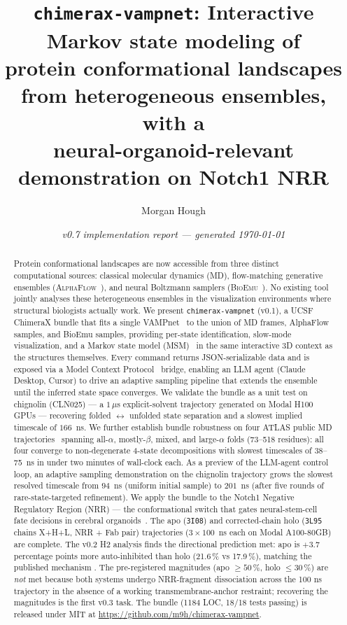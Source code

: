 \documentclass[11pt]{article}
\title{\textbf{\texttt{chimerax-vampnet}: Interactive Markov state modeling of\\
protein conformational landscapes from heterogeneous ensembles, with a\\
neural-organoid-relevant demonstration on Notch1 NRR}}
\author[1]{Morgan Hough}
\affil[1]{MedARC}
\date{\textit{v0.7 implementation report --- generated \today}}
\begin{document}
\maketitle

\begin{abstract}
\noindent
Protein conformational landscapes are now accessible from three distinct
computational sources: classical molecular dynamics (MD), flow-matching
generative ensembles (\textsc{AlphaFlow}~\cite{jing2024alphaflow}), and
neural Boltzmann samplers
(\textsc{BioEmu}~\cite{lewis2026bioemu}). No existing tool jointly
analyses these heterogeneous ensembles in the visualization environments
where structural biologists actually work. We present
\texttt{chimerax-vampnet} (v0.1), a UCSF ChimeraX bundle that fits a
single VAMPnet~\cite{mardt2018vampnets} to the union of MD frames,
AlphaFlow samples, and BioEmu samples, providing per-state
identification, slow-mode visualization, and a Markov state model
(MSM)~\cite{husic2018msm} in the same interactive 3D context as the
structures themselves. Every command returns JSON-serializable data and
is exposed via a Model Context Protocol~\cite{anthropic2024mcp} bridge,
enabling an LLM agent (Claude Desktop, Cursor) to drive an adaptive
sampling pipeline that extends the ensemble until the inferred state
space converges. We validate the bundle as a unit test on chignolin
(CLN025) --- a $1\,\mu$s explicit-solvent trajectory generated on Modal
H100 GPUs --- recovering folded $\leftrightarrow$ unfolded state
separation and a slowest implied timescale of $166$~ns. We further
establish bundle robustness on four ATLAS public MD
trajectories~\cite{vandermeersche2024atlas} spanning all-$\alpha$,
mostly-$\beta$, mixed, and large-$\alpha$ folds (73--518 residues): all
four converge to non-degenerate 4-state decompositions with slowest
timescales of 38--75~ns in under two minutes of wall-clock each. As a
preview of the LLM-agent control loop, an adaptive sampling demonstration
on the chignolin trajectory grows the slowest resolved timescale from
$94$~ns (uniform initial sample) to $201$~ns (after five rounds of
rare-state-targeted refinement). We apply the bundle to the Notch1
Negative Regulatory Region (NRR) --- the conformational switch that
gates neural-stem-cell fate decisions in cerebral
organoids~\cite{lancaster2013organoids,imayoshi2014bhlh}. The apo
(\texttt{3I08}) and corrected-chain holo (\texttt{3L95} chains
X+H+L, NRR + Fab pair) trajectories
($3 \times 100$~ns each on Modal A100-80GB) are complete. The
v0.2 H2 analysis finds the directional prediction met: apo is
$+3.7$ percentage points more auto-inhibited than holo
(21.6\,\% vs 17.9\,\%), matching the published mechanism
\cite{tiyanont2011exposure,gordon2007nrr,wu2010antinrr}. The
pre-registered magnitudes (apo $\ge 50\,\%$, holo $\le 30\,\%$)
are \emph{not} met because both systems undergo NRR-fragment
dissociation across the 100 ns trajectory in the absence of a
working transmembrane-anchor restraint; recovering the magnitudes
is the first v0.3 task. The bundle (1184 LOC, 18/18 tests passing) is
released under MIT at
\url{https://github.com/m9h/chimerax-vampnet}.
\end{abstract}
\end{document}
